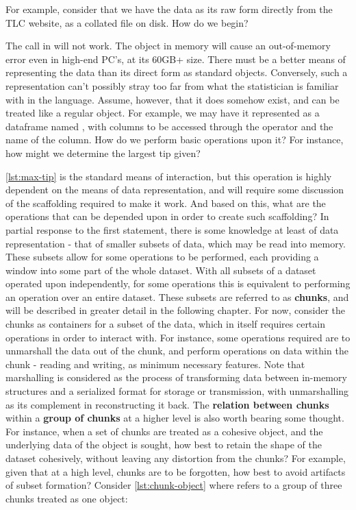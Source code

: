 For example, consider that we have the data as its raw form directly from the TLC website, as a collated  file on disk.
How do we begin?


The call in  will not work.
The object in memory will cause an out-of-memory error even in high-end PC's, at its 60GB+ size.
There must be a better means of representing the data than its direct form as standard \R{} objects.
Conversely, such a representation can't possibly stray too far from what the statistician is familiar with in the language.
Assume, however, that it does somehow exist, and can be treated like a regular object.
For example, we may have it represented as a dataframe named , with columns to be accessed through the  operator and the name of the column.
How do we perform basic operations upon it?
For instance, how might we determine the largest tip given?


\cref{lst:max-tip} is the standard means of interaction, but this operation is highly
dependent on the means of data representation, and will require some
discussion of the scaffolding required to make it work.
And based on this, what are the operations that can be depended upon in order to create such scaffolding?
In partial response to the first statement, there is some knowledge at least of data representation - that of smaller subsets of data, which may be read into memory.
These subsets allow for some operations to be performed, each providing a window into some part of the whole dataset.
With all subsets of a dataset operated upon independently, for some operations this is equivalent to performing an operation over an entire dataset.
These subsets are referred to as \textbf{chunks}, and will be described in greater detail in the following chapter.
For now, consider the chunks as containers for a subset of the data, which in itself requires certain operations in order to interact with.
For instance, some operations required are to unmarshall the data out of the chunk, and perform operations on data within the chunk - reading and writing, as minimum necessary features.
Note that marshalling is considered as the process of transforming data between in-memory structures and a serialized format for storage or transmission, with unmarshalling as its complement in reconstructing it back.
The \textbf{relation between chunks} within a \textbf{group of chunks} at a higher level is also worth bearing some thought.
For instance, when a set of chunks are treated as a cohesive object, and the underlying data of the object is sought, how best to retain the shape of the dataset cohesively, without leaving any distortion from the chunks?
For example, given that at a high level, chunks are to be forgotten, how best to avoid artifacts of subset formation?
Consider \cref{lst:chunk-object} where  refers to a group of three chunks treated as one object:

